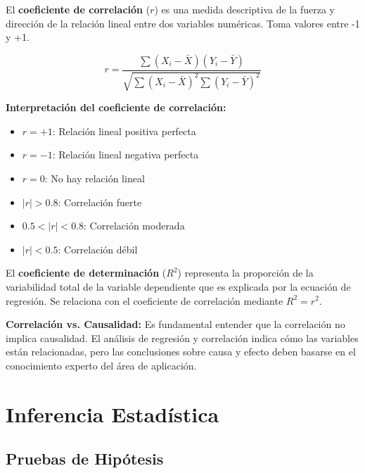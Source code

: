 \begin{definition}
El \textbf{coeficiente de correlación} ($r$) es una medida descriptiva de la fuerza y dirección de la relación lineal entre dos variables numéricas. Toma valores entre -1 y +1.
\end{definition}

$$r = \frac{\sum (X_i - \bar{X})(Y_i - \bar{Y})}{\sqrt{\sum (X_i - \bar{X})^2 \sum (Y_i - \bar{Y})^2}}$$

\begin{remark}
\textbf{Interpretación del coeficiente de correlación:}
\begin{itemize}
\item $r = +1$: Relación lineal positiva perfecta
\item $r = -1$: Relación lineal negativa perfecta
\item $r = 0$: No hay relación lineal
\item $|r| > 0.8$: Correlación fuerte
\item $0.5 < |r| < 0.8$: Correlación moderada
\item $|r| < 0.5$: Correlación débil
\end{itemize}
\end{remark}

\begin{definition}
El \textbf{coeficiente de determinación} ($R^2$) representa la proporción de la variabilidad total de la variable dependiente que es explicada por la ecuación de regresión. Se relaciona con el coeficiente de correlación mediante $R^2 = r^2$.
\end{definition}

\begin{remark}
\textbf{Correlación vs. Causalidad:} Es fundamental entender que la correlación no implica causalidad. El análisis de regresión y correlación indica cómo las variables están relacionadas, pero las conclusiones sobre causa y efecto deben basarse en el conocimiento experto del área de aplicación.
\end{remark}

\section{Inferencia Estadística}

\subsection{Pruebas de Hipótesis}


